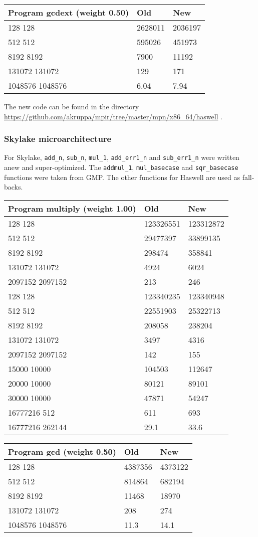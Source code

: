 \begin{longtable}[c]{@{}lll@{}}
\toprule
Program gcdext (weight 0.50) & Old & New\tabularnewline
\midrule
\endhead
128 128 & 2628011 & 2036197\tabularnewline
512 512 & 595026 & 451973\tabularnewline
8192 8192 & 7900 & 11192\tabularnewline
131072 131072 & 129 & 171\tabularnewline
1048576 1048576 & 6.04 & 7.94\tabularnewline
\bottomrule
\end{longtable}

The new code can be found in the directory
\url{https://github.com/akruppa/mpir/tree/master/mpn/x86_64/haswell} .

\subsubsection{Skylake
microarchitecture}\label{skylake-microarchitecture}

For Skylake, \texttt{add\_n}, \texttt{sub\_n}, \texttt{mul\_1},
\texttt{add\_err1\_n} and \texttt{sub\_err1\_n} were written anew and
super-optimized. The \texttt{addmul\_1}, \texttt{mul\_basecase} and
\texttt{sqr\_basecase} functions were taken from GMP. The other
functions for Haswell are used as fall-backs.

\begin{longtable}[c]{@{}lll@{}}
\toprule
Program multiply (weight 1.00) & Old & New\tabularnewline
\midrule
\endhead
128 128 & 123326551 & 123312872\tabularnewline
512 512 & 29477397 & 33899135\tabularnewline
8192 8192 & 298474 & 358841\tabularnewline
131072 131072 & 4924 & 6024\tabularnewline
2097152 2097152 & 213 & 246\tabularnewline
128 128 & 123340235 & 123340948\tabularnewline
512 512 & 22551903 & 25322713\tabularnewline
8192 8192 & 208058 & 238204\tabularnewline
131072 131072 & 3497 & 4316\tabularnewline
2097152 2097152 & 142 & 155\tabularnewline
15000 10000 & 104503 & 112647\tabularnewline
20000 10000 & 80121 & 89101\tabularnewline
30000 10000 & 47871 & 54247\tabularnewline
16777216 512 & 611 & 693\tabularnewline
16777216 262144 & 29.1 & 33.6\tabularnewline
\bottomrule
\end{longtable}

\begin{longtable}[c]{@{}lll@{}}
\toprule
Program gcd (weight 0.50) & Old & New\tabularnewline
\midrule
\endhead
128 128 & 4387356 & 4373122\tabularnewline
512 512 & 814864 & 682194\tabularnewline
8192 8192 & 11468 & 18970\tabularnewline
131072 131072 & 208 & 274\tabularnewline
1048576 1048576 & 11.3 & 14.1\tabularnewline
\bottomrule
\end{longtable}

